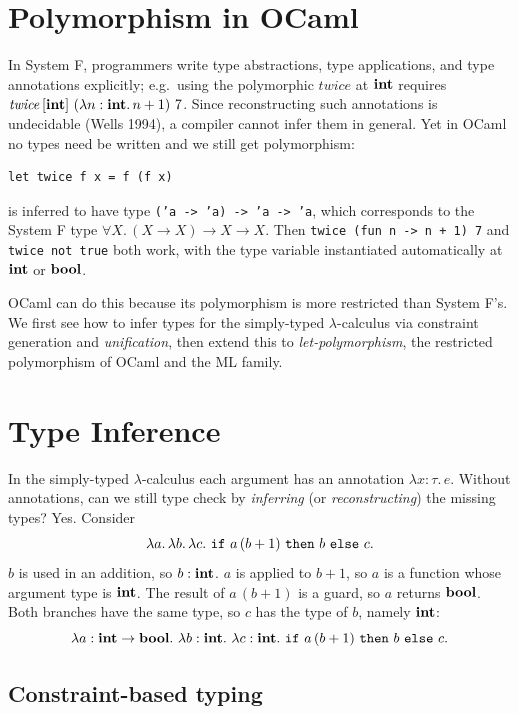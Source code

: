 % 
\section{Polymorphism in OCaml}

In System F, programmers write type abstractions, type applications, and type
annotations explicitly; e.g.\ using the polymorphic $\mathit{twice}$ at $\mathbf{int}$
requires $\mathit{twice}\,[\mathbf{int}]\ (\lambda n : \mathbf{int}.\, n + 1)\ 7$. Since
reconstructing such annotations is undecidable (Wells 1994), a compiler cannot infer
them in general. Yet in OCaml no types need be written and we still get
polymorphism:
\begin{verbatim}
let twice f x = f (f x)
\end{verbatim}
is inferred to have type \texttt{('a -> 'a) -> 'a -> 'a}, which corresponds to the
System F type $\forall X.\, (X \to X) \to X \to X$. Then
\texttt{twice (fun n -> n + 1) 7} and \texttt{twice not true} both work, with the
type variable instantiated automatically at $\mathbf{int}$ or $\mathbf{bool}$.

OCaml can do this because its polymorphism is more restricted than System F's. We
first see how to infer types for the simply-typed $\lambda$-calculus via constraint
generation and \emph{unification}, then extend this to \emph{let-polymorphism}, the
restricted polymorphism of OCaml and the ML family.

\section{Type Inference}

In the simply-typed $\lambda$-calculus each argument has an annotation
$\lambda x : \tau.\, e$. Without annotations, can we still type check by
\emph{inferring} (or \emph{reconstructing}) the missing types? Yes. Consider
\[
\lambda a.\, \lambda b.\, \lambda c.\ \ttkw{if}\ a\,(b + 1)\ \ttkw{then}\ b\ \ttkw{else}\ c.
\]
$b$ is used in an addition, so $b : \mathbf{int}$. $a$ is applied to $b + 1$, so $a$ is a
function whose argument type is $\mathbf{int}$. The result of $a\,(b+1)$ is a guard, so
$a$ returns $\mathbf{bool}$. Both branches have the same type, so $c$ has the type of
$b$, namely $\mathbf{int}$:
\[
\lambda a : \kw{int} \to \kw{bool}.\ \lambda b : \kw{int}.\ \lambda c : \kw{int}.\ \ttkw{if}\ a\,(b + 1)\ \ttkw{then}\ b\ \ttkw{else}\ c.
\]

\subsection{Constraint-based typing}

